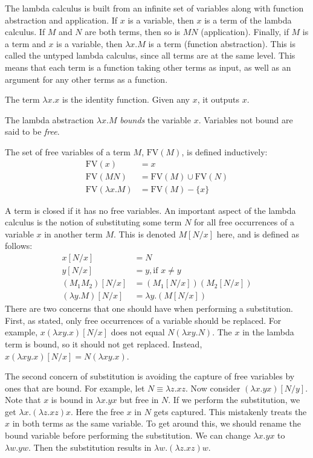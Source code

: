 The lambda calculus is built from an infinite set of variables along with function abstraction and application.  If $x$ is a variable, then $x$ is a term of the lambda calculus.  If $M$ and $N$ are both terms, then so is $MN$ (application).  Finally, if $M$ is a term and $x$ is a variable, then $\lambda x.M$ is a term (function abstraction).  This is called the untyped lambda calculus, since all terms are at the same level.  This means that each term is a function taking other terms as input, as well as an argument for any other terms as a function.
\begin{example}
The term $\lambda x.x$ is the identity function.  Given any $x$, it outputs $x$.
\end{example}
The lambda abstraction $\lambda x.M$ \emph{bounds} the variable $x$.  Variables not bound are said to be \emph{free}.
\begin{definition}
The set of free variables of a term $M$, $\textrm{FV}(M)$, is defined inductively:
\begin{align*}
\textrm{FV}(x) &= x \\
\textrm{FV}(MN) &= \textrm{FV}(M)\cup \textrm{FV}(N) \\
\textrm{FV}(\lambda x.M) &= \textrm{FV}(M) - \{x\}
\end{align*}
\end{definition}
A term is closed if it has no free variables.  An important aspect of the lambda calculus is the notion of substituting some term $N$ for all free occurrences of a variable $x$ in another term $M$.  This is denoted $M[N/x]$ here, and is defined as follows:
\begin{align*}
x[N/x] &= N \\
y[N/x] &= y, \text{if } x\neq y \\
(M_{1}M_{2})[N/x] &= (M_{1}[N/x])(M_{2}[N/x]) \\
(\lambda y.M)[N/x] &= \lambda y.(M[N/x])
\end{align*}
There are two concerns that one should have when performing a substitution.  First, as stated, only free occurrences of a variable should be replaced.  For example, $x(\lambda xy.x)[N/x]$ does not equal $N(\lambda xy.N)$.  The $x$ in the lambda term is bound, so it should not get replaced.  Instead, $x(\lambda xy.x)[N/x] = N(\lambda xy.x)$. 

The second concern of substitution is avoiding the capture of free variables by ones that are bound.  For example, let $N\equiv \lambda z.xz$.  Now consider $(\lambda x.yx)[N/y]$.  Note that $x$ is bound in $\lambda x.yx$ but free in $N$.  If we perform the substitution, we get $\lambda x.(\lambda z.xz)x$.  Here the free $x$ in $N$ gets captured.  This mistakenly treats the $x$ in both terms as the same variable.  To get around this, we should rename the bound variable before performing the substitution.  We can change $\lambda x.yx$ to $\lambda w.yw$.  Then the substitution results in $\lambda w.(\lambda z.xz)w$.

